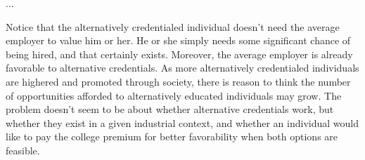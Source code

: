 \documentclass[review]{elsarticle}
\begin{document}
...


Notice that the alternatively credentialed individual doesn't need the average employer to value him or her.
He or she simply needs some significant chance of being hired, and that certainly exists.
Moreover, the average employer is already favorable to alternative credentials.
As more alternatively credentialed individuals are highered and promoted through society,
there is reason to think the number of opportunities afforded to alternatively educated individuals may grow.
The problem doesn't seem to be about whether alternative credentials work, but whether they exist in a given industrial context,
and whether an individual would like to pay the college premium for better favorability when both options are feasible.


\end{document}
